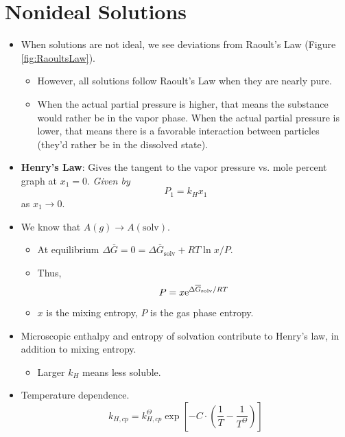 \documentclass[../notes.tex]{subfiles}
\begin{document}
\section{Nonideal Solutions}
\begin{itemize}
    \item {}When solutions are not ideal, we see deviations from Raoult's Law (Figure \ref{fig:RaoultsLaw}).
    \begin{itemize}
        \item However, all solutions follow Raoult's Law when they are nearly pure.
        \item When the actual partial pressure is higher, that means the substance would rather be in the vapor phase. When the actual partial pressure is lower, that means there is a favorable interaction between particles (they'd rather be in the dissolved state).
    \end{itemize}
    \item \textbf{Henry's Law}: Gives the tangent to the vapor pressure vs. mole percent graph at $x_1=0$. \emph{Given by}
    \begin{equation*}
        P_1 = k_Hx_1
    \end{equation*}
    as $x_1\to 0$.
    \item We know that $A(g)\to A(\text{solv})$.
    \begin{itemize}
        \item At equilibrium $\Delta\overline{G}=0=\Delta\overline{G}_\text{solv}+RT\ln x/P$.
        \item Thus,
        \begin{equation*}
            P = x\e[\Delta\overline{G}_\text{solv}/RT]
        \end{equation*}
        \item $x$ is the mixing entropy, $P$ is the gas phase entropy.
    \end{itemize}
    \item Microscopic enthalpy and entropy of solvation contribute to Henry's law, in addition to mixing entropy.
    \begin{itemize}
        \item Larger $k_H$ means less soluble.
    \end{itemize}
    \item Temperature dependence.
    \begin{equation*}
        k_{H,cp} = k_{H,cp}^\Theta\exp\left[ -C\cdot\left( \frac{1}{T}-\frac{1}{T^\Theta} \right) \right]
    \end{equation*}

\end{itemize}
\end{document}
